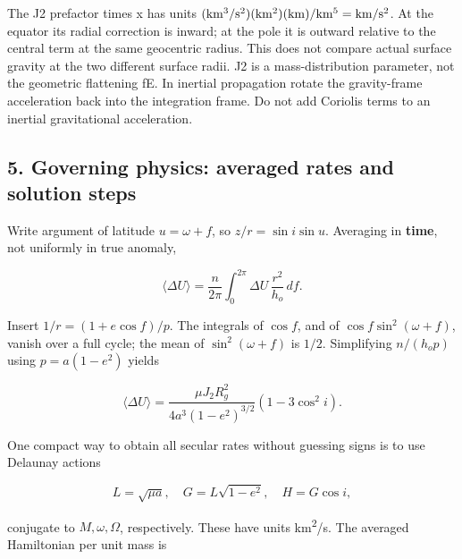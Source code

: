 \documentclass[10pt,a4paper]{article}
\numberwithin{equation}{section}
\begin{document}
\begin{sloppypar}The J2 prefactor times x has units \(({\rm km^3/s^2})({\rm km^2})({\rm km})/{\rm km^5}={\rm km/s^2}\). At the equator its radial correction is inward; at the pole it is outward relative to the central term at the same geocentric radius. This does not compare actual surface gravity at the two different surface radii. J2 is a mass-distribution parameter, not the geometric flattening fE. In inertial propagation rotate the gravity-frame acceleration back into the integration frame. Do not add Coriolis terms to an inertial gravitational acceleration.\end{sloppypar}


\subsection*{5. Governing physics: averaged rates and solution steps}

\begin{sloppypar}Write argument of latitude \(u=\omega+f\), so \(z/r=\sin i\sin u\). Averaging in \textbf{time}, not uniformly in true anomaly,\end{sloppypar}


\begin{equation}\langle\Delta U\rangle=\frac{n}{2\pi}\int_0^{2\pi}\Delta U\,\frac{r^2}{h_o}\,df.\label{eq:ch3-7}\end{equation}

\begin{sloppypar}Insert \(1/r=(1+e\cos f)/p\). The integrals of \(\cos f\), and of \(\cos f\sin^2(\omega+f)\), vanish over a full cycle; the mean of \(\sin^2(\omega+f)\) is \(1/2\). Simplifying \(n/(h_op)\) using \(p=a(1-e^2)\) yields\end{sloppypar}


\begin{equation}\langle\Delta U\rangle
=\frac{\mu J_2R_g^2}{4a^3(1-e^2)^{3/2}}(1-3\cos^2i).\label{eq:ch3-8}\end{equation}

\begin{sloppypar}One compact way to obtain all secular rates without guessing signs is to use Delaunay actions\end{sloppypar}


\begin{equation}L=\sqrt{\mu a},\quad G=L\sqrt{1-e^2},\quad H=G\cos i,\label{eq:ch3-9}\end{equation}

\begin{sloppypar}conjugate to \(M,\omega,\Omega\), respectively. These have units km\textsuperscript{2}/s. The averaged Hamiltonian per unit mass is\end{sloppypar}
\end{document}
